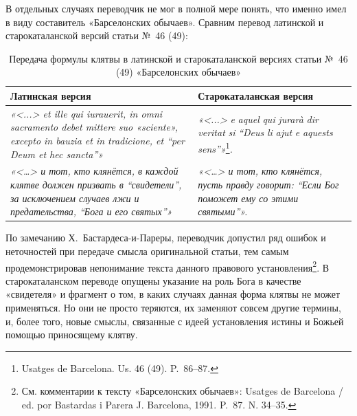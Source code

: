 В отдельных случаях переводчик не мог в полной мере понять, что именно имел в виду составитель «Барселонских обычаев». Сравним перевод латинской и старокаталанской версий статьи №~46 (49):

\begin{center}
\small
\setlength{\tabcolsep}{2pt}
\begin{longtable}{|p{}|p{}|}
\caption{Передача формулы клятвы в латинской и старокаталанской версиях статьи №~46 (49) «Барселонских обычаев»}\label{tab:ch2-oath-formula}\\
\hline
\textbf{Латинская версия} & \textbf{Старокаталанская версия} \\ \hline
\emph{«<...> et ille qui iurauerit, in omni sacramento debet mittere suo «sciente», excepto in bauzia et in tradicione, et “per Deum et hec sancta”»} & \emph{«<...> }\emph{e}\emph{ }\emph{aquel}\emph{ }\emph{qui}\emph{ }\emph{jurar}\emph{à }\emph{dir}\emph{ }\emph{veritat}\emph{ }\emph{si}\emph{ }\emph{“}\emph{Deus}\emph{ }\emph{li}\emph{ }\emph{ajut}\emph{ }\emph{e}\emph{ }\emph{aquests}\emph{ }\emph{sens}\emph{”»}\footnote{Usatges de Barcelona. Us. 46 (49). P.~86--87.}\emph{.} \\ \hline
\emph{«<…> и тот, кто клянётся, в каждой клятве должен призвать в “свидетели”, за исключением случаев лжи и предательства, “Бога и его святых”»} & \emph{«<…> и тот, кто клянётся, пусть правду говорит: “Если Бог поможет ему со этими святыми”»}\emph{.} \\ \hline
\end{longtable}
\end{center}

По замечанию Х.~Бастардеса-и-Пареры, переводчик допустил ряд ошибок и неточностей при передаче смысла оригинальной статьи, тем самым продемонстрировав непонимание текста данного правового установления\footnote{См. комментарии к тексту «Барселонских обычаев»: Usatges de Barcelona / ed. por Bastardas i Parera J. Barcelona, 1991. P.~87. N. 34--35.}. В старокаталанском переводе опущены указание на роль Бога в качестве «свидетеля» и фрагмент о том, в каких случаях данная форма клятвы не может применяться. Но они не просто теряются, их заменяют совсем другие термины, и, более того, новые смыслы, связанные с идеей установления истины и Божьей помощью приносящему клятву.

